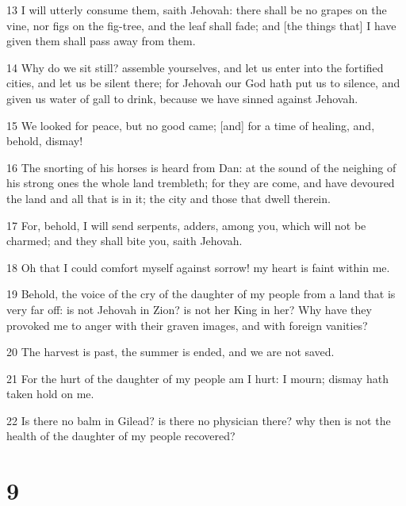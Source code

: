 \par 13 I will utterly consume them, saith Jehovah: there shall be no grapes on the vine, nor figs on the fig-tree, and the leaf shall fade; and [the things that] I have given them shall pass away from them.
\par 14 Why do we sit still? assemble yourselves, and let us enter into the fortified cities, and let us be silent there; for Jehovah our God hath put us to silence, and given us water of gall to drink, because we have sinned against Jehovah.
\par 15 We looked for peace, but no good came; [and] for a time of healing, and, behold, dismay!
\par 16 The snorting of his horses is heard from Dan: at the sound of the neighing of his strong ones the whole land trembleth; for they are come, and have devoured the land and all that is in it; the city and those that dwell therein.
\par 17 For, behold, I will send serpents, adders, among you, which will not be charmed; and they shall bite you, saith Jehovah.
\par 18 Oh that I could comfort myself against sorrow! my heart is faint within me.
\par 19 Behold, the voice of the cry of the daughter of my people from a land that is very far off: is not Jehovah in Zion? is not her King in her? Why have they provoked me to anger with their graven images, and with foreign vanities?
\par 20 The harvest is past, the summer is ended, and we are not saved.
\par 21 For the hurt of the daughter of my people am I hurt: I mourn; dismay hath taken hold on me.
\par 22 Is there no balm in Gilead? is there no physician there? why then is not the health of the daughter of my people recovered?

\chapter{9}

